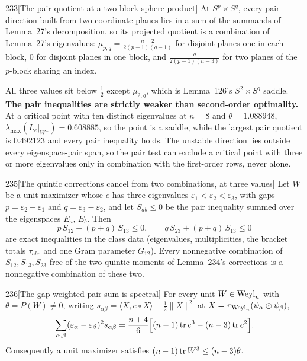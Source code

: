 \begin{Lem}{233}[The pair quotient at a two-block sphere product]
At $S^p\times S^q$, every pair direction built from two coordinate planes lies in a sum of the summands of Lemma~27's decomposition, so its projected quotient is a combination of Lemma~27's eigenvalues: $\mu_{p,q}=\frac{n-2}{2(p-1)(q-1)}$ for disjoint planes one in each block, $0$ for disjoint planes in one block, and $\frac{q}{2(p-1)(n-3)}$ for two planes of the $p$-block sharing an index.
\end{Lem}

All three values sit below $\tfrac12$ except $\mu_{2,q}$, which is Lemma~126's $S^2\times S^q$ saddle. \textbf{The pair inequalities are strictly weaker than second-order optimality.} At a critical point with ten distinct eigenvalues at $n=8$ and $\theta=1.088948$, $\lambda_{\max}(L_e|_{W^\perp})=0.608885$, so the point is a saddle, while the largest pair quotient is $0.492123$ and every pair inequality holds. The unstable direction lies outside every eigenspace-pair span, so the pair test can exclude a critical point with three or more eigenvalues only in combination with the first-order rows, never alone.

\begin{Lem}{235}[The quintic corrections cancel from two combinations, at three values]
Let $W$ be a unit maximizer whose $e$ has three eigenvalues $\varepsilon_1<\varepsilon_2<\varepsilon_3$, with gaps $p=\varepsilon_2-\varepsilon_1$ and $q=\varepsilon_3-\varepsilon_2$, and let $S_{ab}\le0$ be the pair inequality summed over the eigenspaces $E_a$, $E_b$. Then
\[
p\,S_{12}+(p+q)\,S_{13}\le0,\qquad q\,S_{23}+(p+q)\,S_{13}\le0
\]
are exact inequalities in the class data (eigenvalues, multiplicities, the bracket totals $\tau_{abc}$ and one Gram parameter $G_{12}$). Every nonnegative combination of $S_{12},S_{13},S_{23}$ free of the two quintic moments of Lemma~234's corrections is a nonnegative combination of these two.
\end{Lem}

\begin{Lem}{236}[The gap-weighted pair sum is spectral]
For every unit $W\in\mathrm{Weyl}_n$ with $\theta=P(W)\ne0$, writing $s_{\alpha\beta}=\langle X,e\circ X\rangle-\tfrac12\lVert X\rVert^2$ at $X=\pi_{\mathrm{Weyl}_n}(\psi_\alpha\odot\psi_\beta)$,
\[
\sum_{\alpha,\beta}(\varepsilon_\alpha-\varepsilon_\beta)^2s_{\alpha\beta}=\frac{n+4}{6}\Big[(n-1)\operatorname{tr} e^3-(n-3)\operatorname{tr} e^2\Big].
\]
Consequently a unit maximizer satisfies $(n-1)\operatorname{tr} W^3\le(n-3)\theta$.
\end{Lem}

